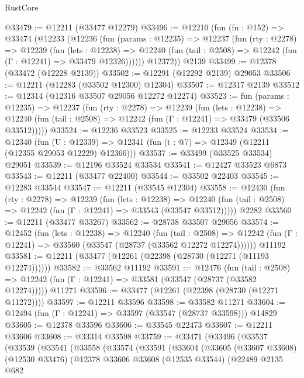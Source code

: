 \begin{lexlean}{RustCore}
\begin{coremodule}
@33479 := @12211 (@33477 @12279)
@33496 := @12210
    (fun (fn : @152) =>
    @33474
      (@12233
        (@12236
          (fun (params : @12235) =>
          @12237
            (fun (rty : @2278) =>
            @12239
              (fun (lets : @12238) =>
              @12240 (fun (tail : @2508) => @12242 (fun (Γ : @12241) => @33479 @12326))))))
        @12372))
    @2139
@33499 := @12378 (@33472 (@12228 @2139))
@33502 := @12291 (@12292 @2139) @29053
@33506 := @12211 (@12283 (@33502 @12300) @12304)
@33507 := @12317 @2139
@33512 := @12314 (@12316 @33507 @29056 @12272 @12274)
@33523 := fun (params : @12235) =>
  @12237
    (fun (rty : @2278) =>
    @12239
      (fun (lets : @12238) =>
      @12240 (fun (tail : @2508) => @12242 (fun (Γ : @12241) => @33479 (@33506 @33512)))))
@33524 := @12236 @33523
@33525 := @12233 @33524
@33534 := @12340
    (fun (U : @12339) => @12341 (fun (t : @7) => @12349 (@12211 (@12355 @29053 @12229) @12366)))
@33537 := @33499 (@33525 @33534) @29051
@33539 := @12196 @33524 @33534
@33541 := @12427 @33523 @6873
@33543 := @12211 (@33477 @22400)
@33544 := @33502 @22403
@33545 := @12283 @33544
@33547 := @12211 (@33545 @12304)
@33558 := @12430
    (fun (rty : @2278) =>
    @12239
      (fun (lets : @12238) =>
      @12240 (fun (tail : @2508) => @12242 (fun (Γ : @12241) => @33543 (@33547 @33512)))))
    @2282
@33560 := @12211 (@33477 @33267)
@33562 := @28738 @33507 @29056
@33574 := @12452
    (fun (lets : @12238) =>
    @12240
      (fun (tail : @2508) =>
      @12242 (fun (Γ : @12241) => @33560 (@33547 (@28737 (@33562 @12272 @12274))))))
    @11192
@33581 := @12211 (@33477 (@12261 (@22398 (@28730 (@12271 (@11193 @12274))))))
@33582 := @33562 @11192
@33591 := @12476
    (fun (tail : @2508) => @12242 (fun (Γ : @12241) => @33581 (@33547 (@28737 (@33582 @12274)))))
    @11271
@33596 := @33477 (@12261 (@22398 (@28730 (@12271 @11272))))
@33597 := @12211 @33596
@33598 := @33582 @11271
@33604 := @12494 (fun (Γ : @12241) => @33597 (@33547 (@28737 @33598))) @14829
@33605 := @12378 @33596
@33606 := @33545 @22473
@33607 := @12211 @33606
@33608 := @33314 @33598
@33759 := @33471
    (@33496
      (@33537
        (@33539
          (@33541
            (@33558
              (@33574
                (@33591
                  (@33604
                    (@33605
                      (@33607 @33608)
                      (@12530 @33476)
                      (@12378
                        @33606
                        @33608
                        (@12535 @33544)
                        (@22489
                          @2135
                          @682

\end{coremodule}
\end{lexlean}
